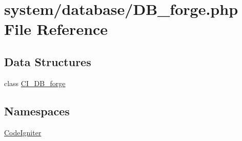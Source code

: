 \hypertarget{_d_b__forge_8php}{\section{system/database/\-D\-B\-\_\-forge.php File Reference}
\label{_d_b__forge_8php}
}
\subsection*{Data Structures}
\begin{DoxyCompactItemize}
\item 
class \hyperlink{class_c_i___d_b__forge}{C\-I\-\_\-\-D\-B\-\_\-forge}
\end{DoxyCompactItemize}
\subsection*{Namespaces}
\begin{DoxyCompactItemize}
\item 
\hyperlink{namespace_code_igniter}{Code\-Igniter}
\end{DoxyCompactItemize}
